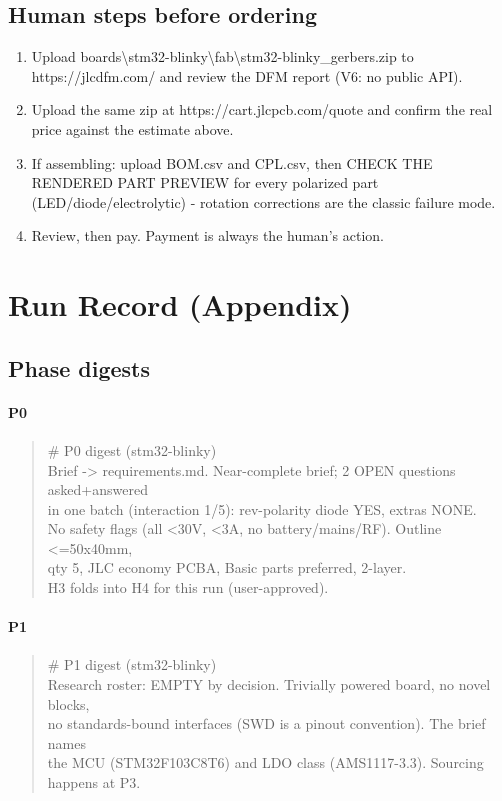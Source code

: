 \documentclass[11pt,a4paper]{article}
\begin{document}
\subsection*{Human steps before ordering}
\begin{enumerate}
\item Upload boards\textbackslash{}stm32-blinky\textbackslash{}fab\textbackslash{}stm32-blinky\_gerbers.zip to https://jlcdfm.com/ and review the DFM report (V6: no public API).
\item Upload the same zip at https://cart.jlcpcb.com/quote and confirm the real price against the estimate above.
\item If assembling: upload BOM.csv and CPL.csv, then CHECK THE RENDERED PART PREVIEW for every polarized part (LED/diode/electrolytic) - rotation corrections are the classic failure mode.
\item Review, then pay. Payment is always the human's action.
\end{enumerate}
\section{Run Record (Appendix)}
\subsection*{Phase digests}
\paragraph*{P0}
\begin{quote}\small\ttfamily\raggedright
\# P0 digest (stm32-blinky)\\
Brief -\textgreater{} requirements.md. Near-complete brief; 2 OPEN questions asked+answered\\
in one batch (interaction 1/5): rev-polarity diode YES, extras NONE.\\
No safety flags (all \textless{}30V, \textless{}3A, no battery/mains/RF). Outline \textless{}=50x40mm,\\
qty 5, JLC economy PCBA, Basic parts preferred, 2-layer.\\
H3 folds into H4 for this run (user-approved).
\end{quote}
\paragraph*{P1}
\begin{quote}\small\ttfamily\raggedright
\# P1 digest (stm32-blinky)\\
Research roster: EMPTY by decision. Trivially powered board, no novel blocks,\\
no standards-bound interfaces (SWD is a pinout convention). The brief names\\
the MCU (STM32F103C8T6) and LDO class (AMS1117-3.3). Sourcing happens at P3.
\end{quote}
\end{document}
